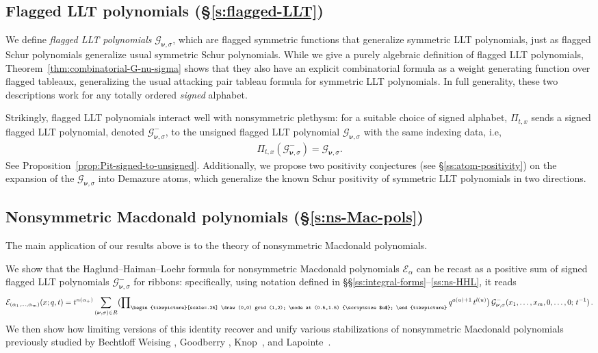 \documentclass[12pt]{amsart}
\theoremstyle{definition}
\theoremstyle{remark}
\newcommand{\nubold}{{\boldsymbol \nu }}
\newcommand{\Ecal}{{\mathcal E}}
\newcommand{\Gcal}{{\mathcal G}}
\newcommand{\domino}{\begin{tikzpicture}[scale=.25]
\draw (0,0) grid (1,2);
\node at (0.5,1.5) {\scriptsize $u$};
\end{tikzpicture}}
\begin{document}
\subsection{Flagged LLT polynomials (\S \ref{s:flagged-LLT})}
We define \emph{flagged
LLT polynomials} \(\Gcal_{\nubold,\sigma}\),
which are flagged
symmetric functions that generalize
symmetric LLT polynomials, just as
flagged Schur polynomials
generalize usual symmetric Schur polynomials.
While we give a purely algebraic definition of flagged LLT
polynomials, Theorem~\ref{thm:combinatorial-G-nu-sigma} shows that they
also have an explicit combinatorial formula as a weight generating function
over flagged tableaux, generalizing the usual attacking pair tableau
formula for symmetric LLT polynomials.
In full generality, these two descriptions work for any totally ordered
\emph{signed} alphabet.

Strikingly, flagged LLT polynomials interact well with nonsymmetric
plethysm: for a suitable choice of signed alphabet, \(\Pi_{t,x}\)
sends a signed flagged LLT polynomial, denoted
\(\Gcal^-_{\nubold,\sigma}\), to the unsigned flagged LLT polynomial
\(\Gcal_{\nubold,\sigma}\) with the same indexing data, i.e,
\begin{align}
\label{e Pi on G intro}
\Pi_{t,x}(\Gcal^-_{\nubold,\sigma}) = \Gcal_{\nubold,\sigma}.
\end{align}
See Proposition~\ref{prop:Pit-signed-to-unsigned}.  Additionally, we
propose two positivity conjectures (see \S \ref{ss:atom-positivity})
on the expansion of the \(\Gcal_{\nubold,\sigma}\) into Demazure
atoms, which generalize the known Schur positivity of symmetric LLT
polynomials in two directions.

\subsection{Nonsymmetric Macdonald polynomials (\S \ref{s:ns-Mac-pols})}
The main
application of our results above is
to the theory of nonsymmetric Macdonald polynomials.

We show that the Haglund--Haiman--Loehr formula \cite{HagHaiLo08} for
nonsymmetric Macdonald polynomials $\Ecal _{\alpha}$ can be recast as
a positive sum of signed flagged LLT polynomials
\(\Gcal^-_{\nubold,\sigma}\) for ribbons: specifically, using notation
defined in \S \S \ref{ss:integral-forms}--\ref{ss:ns-HHL}, it reads
\begin{equation}\label{e:ns-HHL intro}
\Ecal _{(\alpha _{1},\ldots,\alpha _{m})}(x;q,t) = t^{n(\alpha _{+})} \sum
_{(\nubold ,\sigma )\in R} \bigl( \prod \nolimits_{\domino }
q^{a(u)+1}\, t^{l(u)} \bigr)\, \Gcal _{\nubold ,\sigma
}^{-}(x_{1},\ldots,x_{m},0,\ldots,0;\, t^{-1})\, .
\end{equation}
We then show how limiting versions of this identity recover and unify
various stabilizations of nonsymmetric Macdonald polynomials
previously studied by Bechtloff Weising \cite{BechtloffWeising23},
Goodberry \cite{Goodberry22, Goodberry24}, Knop~\cite{Knop07}, and
Lapointe~\cite{Lapointe22}.
\end{document}
